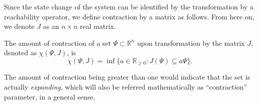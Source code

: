 Since the state change of the system can be identified by the
transformation by a reachability operator, we define contraction by
a matrix as follows.  From here on, we denote $J$ as an
$n\times n$ real matrix.
%
\begin{defn} The amount of contraction of a set
  $\Psi\subset\mathbb{R}^n$ upon transformation by the matrix $J$,
  denoted as $\chi(\Psi,J)$, is $$\chi(\Psi,J) =
  \inf\{a\in\mathbb{R}_{\geq 0} : J(\Psi)\subseteq a
  \Psi\}.$$ \end{defn}
The amount of contraction being greater than one would indicate that
the set is actually \emph{expanding}, which will also be referred
mathematically as ``contraction'' parameter, in a general sense.
%


